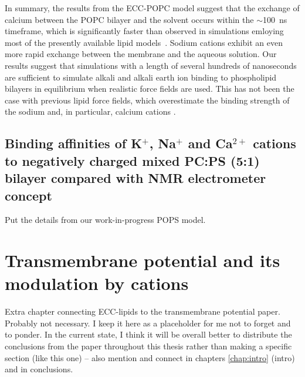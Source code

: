 In summary, the results from the ECC-POPC model suggest that the exchange of calcium between the POPC bilayer and the solvent occurs within the $\sim$100~ns timeframe, which is significantly faster than observed in simulations emloying most of the presently available lipid models~\citep{javanainen17}. Sodium cations exhibit an even more rapid exchange between the membrane and the aqueous solution. Our results suggest that simulations with a length of several hundreds of nanoseconds are sufficient to simulate alkali and alkali earth ion binding to phospholipid bilayers in equilibrium when realistic force fields are used. This has not been the case with previous lipid force fields, which overestimate the binding strength of the sodium and, in particular,  calcium cations \citep{javanainen17, catte16}. 
 
 





\subsection{Binding affinities of K$^+$, Na$^+$ and Ca$^{2+}$ cations to negatively charged mixed PC:PS (5:1) bilayer compared with NMR electrometer concept} 

Put the details from our work-in-progress POPS model. 




\section{Transmembrane potential and its modulation by cations}

Extra chapter connecting ECC-lipids to the transmembrane potential paper.
Probably not necessary.
I keep it here as a placeholder for me not to forget and to ponder.
In the current state, I think it will be overall better to distribute the conclusions from the paper throughout this thesis rather than making a specific section (like this one) -- also mention and connect in chapters \ref{chap:intro} (intro) and in conclusions. 

